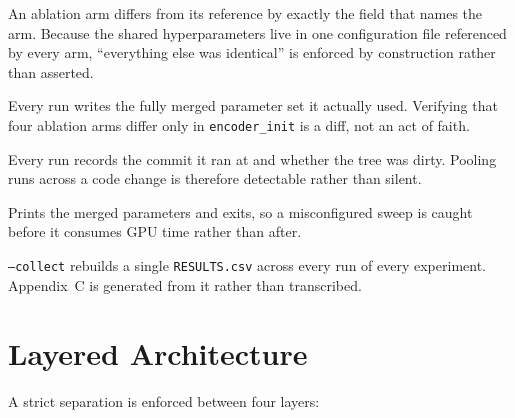 \begin{description}[leftmargin=2.8cm,style=nextline]
  \item[One place per knob] An ablation arm differs from its reference by exactly the field
    that names the arm. Because the shared hyperparameters live in one configuration file
    referenced by every arm, ``everything else was identical'' is enforced by construction
    rather than asserted.
  \item[\texttt{resolved\_config.json}] Every run writes the fully merged parameter set it
    actually used. Verifying that four ablation arms differ only in \texttt{encoder\_init}
    is a diff, not an act of faith.
  \item[Git provenance] Every run records the commit it ran at and whether the tree was
    dirty. Pooling runs across a code change is therefore detectable rather than silent.
  \item[\texttt{--dry-run}] Prints the merged parameters and exits, so a misconfigured sweep
    is caught before it consumes GPU time rather than after.
  \item[A results ledger] \texttt{--collect} rebuilds a single \texttt{RESULTS.csv} across
    every run of every experiment. Appendix~C is generated from it rather than transcribed.
\end{description}


\section{Layered Architecture}
\label{sec:layering}

A strict separation is enforced between four layers:

